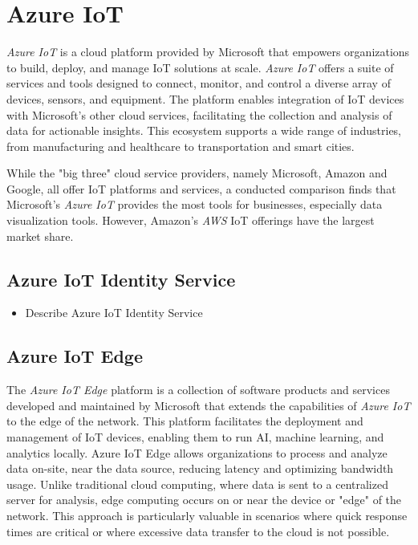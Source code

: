 \section{Azure IoT}
\textit{Azure IoT} is a cloud platform provided by Microsoft that
empowers organizations to build, deploy, and manage \ac{IoT} solutions at scale.
\textit{Azure IoT} offers a suite of services and tools designed to connect,
monitor, and control a diverse array of devices, sensors, and equipment. The
platform enables integration of \ac{IoT} devices with Microsoft's other cloud
services, facilitating the collection and analysis of data for actionable insights.
This ecosystem supports a wide range of industries, from manufacturing and
healthcare to transportation and smart cities\cite{msdoc-aziot}.

While the "big three" cloud service providers, namely Microsoft, Amazon and
Google, all offer \ac{IoT} platforms and services, a conducted comparison finds
that Microsoft's \textit{Azure IoT} provides the most tools for businesses,
especially data visualization tools. However, Amazon's \textit{AWS} \ac{IoT}
offerings have the largest market share\cite{9116254}.

\subsection{Azure IoT Identity Service}
\begin{tcolorbox}[title=TODO]
    \begin{itemize}
        \item Describe Azure IoT Identity Service
    \end{itemize}
\end{tcolorbox}

\subsection{Azure IoT Edge}
The \textit{Azure IoT Edge} platform is a collection of software products and
services developed and maintained by Microsoft that extends the capabilities
of \textit{Azure IoT} to the edge of the network. This platform facilitates the
deployment and management of \ac{IoT} devices, enabling them to run \ac{AI},
machine learning, and analytics locally. Azure IoT Edge allows organizations to
process and analyze data on-site, near the data source, reducing latency and
optimizing bandwidth usage.
Unlike traditional cloud computing, where data is sent to a centralized server
for analysis, edge computing occurs on or near the device or "edge" of the
network. This approach is particularly valuable in scenarios where quick
response times are critical or where excessive data transfer to the cloud
is not possible\cite{msdoc-aziotedge}.

